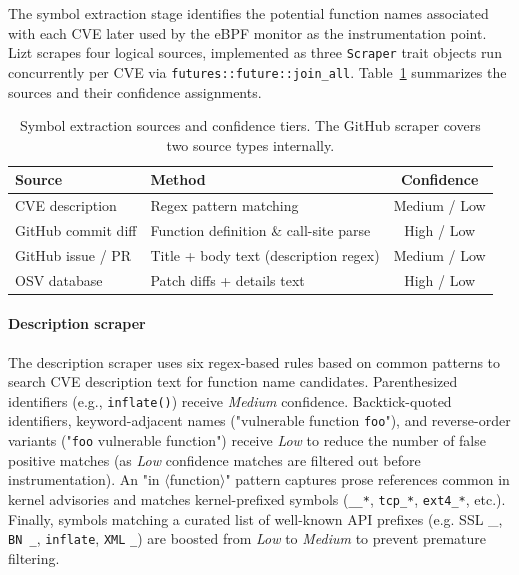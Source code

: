 \documentclass[conference]{IEEEtran}
\begin{document}
The symbol extraction stage identifies the potential function names associated with each CVE later used by the eBPF monitor as the instrumentation point.
Lizt scrapes four logical sources, implemented as three \texttt{Scraper} trait objects run concurrently per CVE via \texttt{futures::future::join\_all}.
Table~\ref{tab:symbol-sources} summarizes the sources and their confidence assignments.

\begin{table}[h]
  \centering
  \label{tab:symbol-sources}
  \begin{tabular}{llc}
    \toprule
    \textbf{Source}        & \textbf{Method}                        & \textbf{Confidence} \\
    \midrule
    CVE description        & Regex pattern matching                 & Medium / Low        \\
    GitHub commit diff     & Function definition \& call-site parse & High / Low          \\
    GitHub issue / PR      & Title + body text (description regex)  & Medium / Low        \\
    OSV database           & Patch diffs + details text             & High / Low          \\
    \bottomrule
  \end{tabular}
  \caption{Symbol extraction sources and confidence tiers. The GitHub scraper covers two source types internally.}
\end{table}

\paragraph{Description scraper}
The description scraper uses six regex-based rules based on common patterns to search CVE description text for function name candidates.
Parenthesized identifiers (e.g., \texttt{inflate()}) receive \textit{Medium} confidence.
Backtick-quoted identifiers, keyword-adjacent names ("vulnerable function \texttt{foo}"), and reverse-order variants ("\texttt{foo} vulnerable function") receive \textit{Low} to reduce the number of false positive matches (as \textit{Low} confidence matches are filtered out before instrumentation).
An "in $\langle$function$\rangle$" pattern captures prose references common in kernel advisories and matches kernel-prefixed symbols (\texttt{\_\_*}, \texttt{tcp\_*}, \texttt{ext4\_*}, etc.).
Finally, symbols matching a curated list of well-known API prefixes (e.g. SSL \_, \texttt{BN \_}, \texttt{inflate}, \texttt{XML} \texttt{\_}) are boosted from \textit{Low} to \textit{Medium} to prevent premature filtering.
\end{document}
